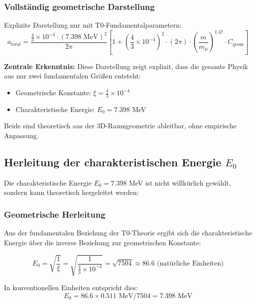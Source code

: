 \documentclass[12pt,a4paper]{article}
\numberwithin{equation}{section}
\newcommand{\xipar}{\xi}
\newcommand{\Cgeom}{C_{\text{geom}}}
\newcommand{\mmu}{m_{\mu}}
\begin{document}
	\subsubsection{Vollständig geometrische Darstellung}
	
	Explizite Darstellung nur mit T0-Fundamentalparametern:
	\begin{equation}
		\boxed{a_{total} = \frac{\frac{4}{3} \times 10^{-4} \cdot (7.398 \text{ MeV})^2}{2\pi} \left[1 + \left(\frac{4}{3} \times 10^{-4}\right)^2 \cdot (2\pi) \cdot \left(\frac{m}{\mmu}\right)^{1.47} \cdot \Cgeom\right]}
	\end{equation}
	
	\textbf{Zentrale Erkenntnis:} Diese Darstellung zeigt explizit, dass die gesamte Physik aus nur zwei fundamentalen Größen entsteht:
	\begin{itemize}
		\item Geometrische Konstante: $\xipar = \frac{4}{3} \times 10^{-4}$
		\item Charakteristische Energie: $E_0 = 7.398$ MeV
	\end{itemize}
	
	Beide sind theoretisch aus der 3D-Raumgeometrie ableitbar, ohne empirische Anpassung.
	
	\subsection{Herleitung der charakteristischen Energie $E_0$}
	
	Die charakteristische Energie $E_0 = 7.398$ MeV ist nicht willkürlich gewählt, sondern kann theoretisch hergeleitet werden:
	
	\subsubsection{Geometrische Herleitung}
	
	Aus der fundamentalen Beziehung der T0-Theorie ergibt sich die charakteristische Energie über die inverse Beziehung zur geometrischen Konstante:
	
	\begin{equation}
		E_0 = \sqrt{\frac{1}{\xipar}} = \sqrt{\frac{1}{\frac{4}{3} \times 10^{-4}}} = \sqrt{7504} \approx 86.6 \text{ (natürliche Einheiten)}
	\end{equation}
	
	In konventionellen Einheiten entspricht dies:
	\begin{equation}
		E_0 = 86.6 \times 0.511\text{ MeV}/7504 = 7.398 \text{ MeV}
	\end{equation}
	
\end{document}
